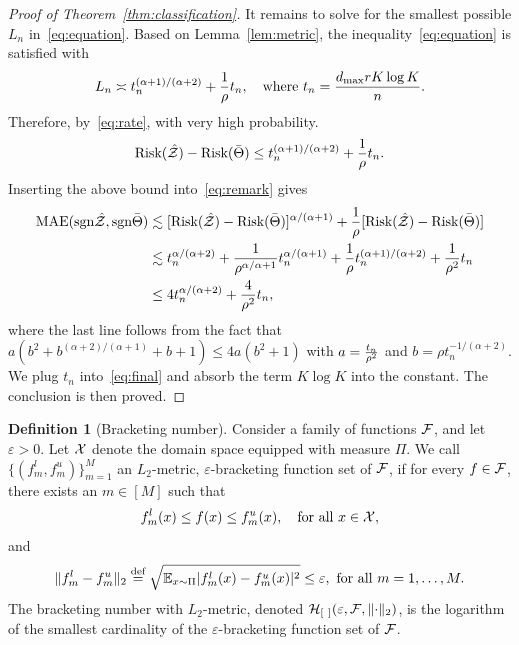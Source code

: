 \documentclass[11pt]{article}
\theoremstyle{plain}
\theoremstyle{definition}
\newtheorem{defn}{Definition}
\def\sign{\textup{sgn}}
\def\risk{\textup{Risk}}
\begin{document}
\begin{proof}[Proof of Theorem~\ref{thm:classification}]
It remains to solve for the smallest possible $L_n$ in~\eqref{eq:equation}. Based on Lemma~\ref{lem:metric}, the inequality~\eqref{eq:equation} is satisfied with 
\begin{equation}\label{eq:tn}
L_n\asymp t_n^{(\alpha+1)/ (\alpha+2)} +{1\over \rho} t_n, \quad \text{where }t_n={d_{\max}rK\log K \over n}.
\end{equation}
Therefore, by~\eqref{eq:rate}, with very high probability. 
\[
\risk(\hat \tZ)-\risk(\bar \Theta )\leq t_n^{(\alpha+1)/(\alpha+2)} +{1\over \rho} t_n.
\]
Inserting the above bound into~\eqref{eq:remark} gives
\begin{align}\label{eq:final}
\textup{MAE}(\sign \hat \tZ, \sign \bar \Theta) &\lesssim [\risk(\hat \tZ)-\risk(\bar \Theta)]^{\alpha/(\alpha+1)}+{1\over \rho}[\risk(\hat \tZ)-\risk(\bar \Theta)]\notag \\
&\lesssim t_n^{\alpha/(\alpha+2)}+{1\over \rho^{\alpha/\alpha+1}}t_n^{\alpha/(\alpha+1)}+{1\over \rho}t_n^{(\alpha+1)/(\alpha+2)}+{1\over \rho^2}t_n\notag \\
&\leq 4t_n^{\alpha/(\alpha+2)}+{4\over \rho^2}t_n,
\end{align}
where the last line follows from the fact that $a(b^2+b^{(\alpha+2)/(\alpha+1)}+b+1) \leq 4 a (b^2+1)$ with $a={t_n \over \rho^2}$ and $b=\rho t_n^{-1/(\alpha+2)}$. We plug $t_n$ into~\eqref{eq:final} and absorb the term $K\log K$ into the constant. The conclusion is then proved. 
\end{proof}

\begin{defn}[Bracketing number]\label{pro:inftynorm}
Consider a family of functions $\mathcal{F}$, and let $\varepsilon>0$. Let $\mathcal{X} $ denote the domain space equipped with measure $\Pi$. We call $\{(f^l_m,f^u_m)\}_{m=1}^M$ an $L_2$-metric, $\varepsilon$-bracketing function set of $\mathcal{F}$, if for every $f\in \mathcal{F}$, there exists an $m\in[M]$ such that 
\[
f^l_m(x)\leq f(x)\leq f^u_m(x),\quad \text{for all }x\in\mathcal{X},
\]
and
\[
\lVert f^l_m-f^u_m\rVert_2\stackrel{\text{def}}{=}\sqrt{\mathbb{E}_{x\sim \Pi}|f^l_m(x)-f^u_m(x)|^2} \leq \varepsilon, \ \text{for all } m=1,\ldots,M. 
\]
The bracketing number with $L_2$-metric, denoted $\mathcal{H}_{[\ ]}(\varepsilon, \mathcal{F}, \lVert\cdot\rVert_2)$, is the logarithm of the smallest cardinality of the $\varepsilon$-bracketing function set of $\mathcal{F}$.  \\
\end{defn}
\end{document}
